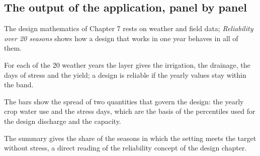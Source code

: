 \subsection{The output of the application, panel by panel}
The design mathematics of Chapter 7 rests on weather and field data; \emph{Reliability over 20 seasons} shows how a design that works in one year behaves in all of them.

For each of the 20 weather years the layer gives the irrigation, the drainage, the days of stress and the yield; a design is reliable if the yearly values stay within the band.


The bars show the spread of two quantities that govern the design: the yearly crop water use and the stress days, which are the basis of the percentiles used for the design discharge and the capacity.


The summary gives the share of the seasons in which the setting meets the target without stress, a direct reading of the reliability concept of the design chapter.


